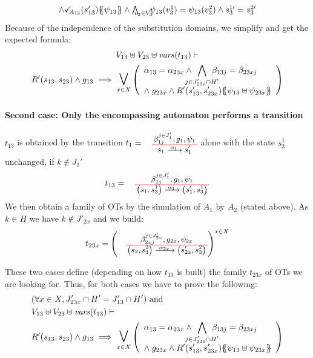 \documentclass[runningheads]{llncs}
\begin{document}
\begin{enumerate}
\begin{multline*}
{\begin{array}{l}
		  \wedge \reach{A_{13}}\mpar{s_{13}'}\psubst{\psi_{13}} 
\wedge \bigwedge_\subbox{v_3\in V_3}  \psi_{13}(v^1_3)=\psi_{13}(v^2_3)\wedge s^{1\prime}_3=s^{2\prime}_3
		\end{array}}   
\end{multline*}	
Because of the independence of the substitution domains, we simplify and get the expected formula:
	\begin{multline*}
  V_{13} \uplus V_{23} \uplus \fvars{t_{13}} \vdash\\ R^{\prime}\mpar{s_{13}, s_{23}} \wedge g_{13} \implies \operatorname*{\bigsymb{\bigvee}}_{x \in X} \mpar{\everymath{\displaystyle}\begin{array}{l}
			\alpha_{13} = \alpha_{23x} \wedge \bigwedge_\subbox{j \in J'_{23x} \cap H'} \beta_{13j} = \beta_{23xj} \\[12pt]
			\nwedge g_{23x} \wedge R^{\prime}\mpar{s'_{13}, s'_{23x}}\psubst{\psi_{13} \uplus \psi_{23x}}
		\end{array}} 
	\end{multline*}
	
\smallskip

\paragraph{Second case: Only the encompassing automaton performs a transition}
 $t_{13}$ is obtained  by  the transition $t_1=\OTx{1}{}{1}{1}$ alone with the state $s^1_3$ unchanged, if $k \not\in J_1'$
\[t_{13} = \OT{\mpar{s_1, s^1_3}}{\mpar{s'_1, s^1_3}}{\alpha_1}{\beta_{1j}^{j \in J'_1}}{g_1}{\psi_1}
\]
We then obtain a family of OTs by the simulation of $A_1$ by $A_2$ (stated above).
As  $k \in H$ we have $k \not\in J'_{2x}$ and we build:
\[t_{23x} = \left(
\OT{\mpar{s_2, s^2_3}}{\mpar{s'_{2x}, s^2_3}}{\alpha_{2x}}{\beta_{2xj}^{j \in J'_{2x}}}{g_{2x}}{\psi_{2x}} \right)^{x\in X}\]

\end{enumerate}

These two cases define (depending on how $t_{13}$ is built) the family $t_{23x}$ of OTs we are looking for.
Thus, for both cases we have to prove the following:
\begin{align*}		
		&\mpar{\forall x \in X, J'_{23x} \cap H' =
 J'_{13} \cap H'} \text{ and }\\
		&  V_{13} \uplus V_{23} \uplus \fvars{t_{13}} \vdash\\ & R'\mpar{s_{13}, s_{23}} \wedge g_{13} \implies \operatorname*{\bigsymb{\bigvee}}_{x \in X} \mpar{\everymath{\displaystyle}\begin{array}{l}
			\alpha_{13} = \alpha_{23x} \wedge \bigwedge_\subbox{j \in J'_{23x} \cap H'} \beta_{13j} = \beta_{23xj} \\[12pt]
			\nwedge g_{23x} \wedge R'\mpar{s'_{13}, s'_{23x}}\psubst{\psi_{13} \uplus \psi_{23x}}
		\end{array}} 
	\end{align*}
	
\end{document}
